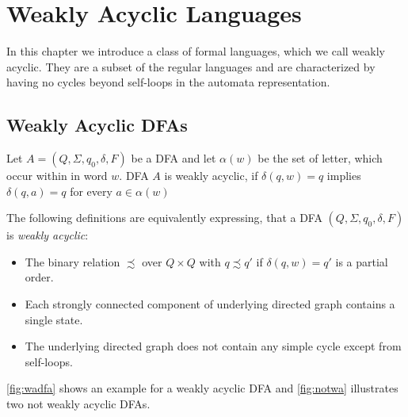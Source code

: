 \chapter{Weakly Acyclic Languages}\label{chapter:weakly_acyclic_language}

In this chapter we introduce a class of formal languages, which we call weakly acyclic. They are a subset of the regular languages and are characterized by having no cycles beyond self-loops in the automata representation.

\section{Weakly Acyclic DFAs}\label{sec:weakly_acyclic_dfa}

\begin{definition}
Let $A = (Q, \Sigma, q_{0},\delta,F)$ be a DFA and let $\alpha(w)$ be the set of letter, which occur within in word $w$. DFA $A$ is weakly acyclic, if $\delta(q,w) = q$ implies $\delta(q,a) = q$ for every $a \in \alpha(w)$
\end{definition}

The following definitions are equivalently expressing, that a DFA $(Q, \Sigma, q_{0},\delta,F)$ is \textit{weakly acyclic}:
\begin{itemize}[--,noitemsep]
	\item The binary relation $\precsim $  over $Q \times Q$ with $q \precsim q'$ if $\delta(q,w) = q'$ is a partial order.
	\item Each strongly connected component of underlying directed graph contains a single state.
	\item The underlying directed graph does not contain any simple cycle except from self-loops.
\end{itemize}

\autoref{fig:wadfa} shows an example for a weakly acyclic DFA and \autoref{fig:notwa} illustrates two not weakly acyclic DFAs.

